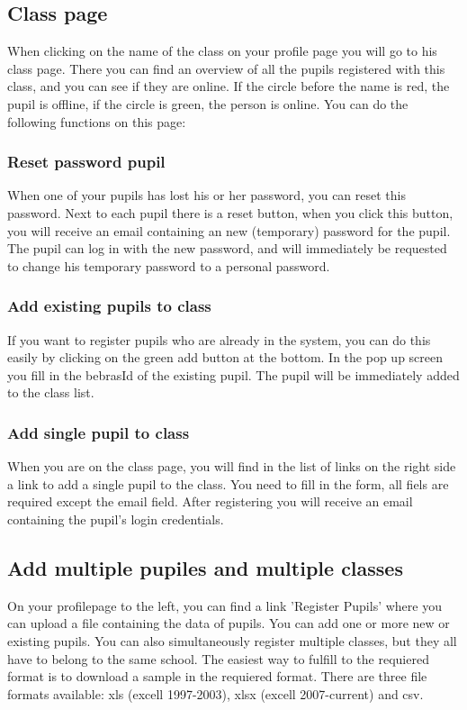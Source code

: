 \documentclass[11pt,a4paper]{report}
\begin{document}
\subsection{Class page}
When clicking on the name of the class on your profile page you will go to his class page. There you can find an overview of all the pupils registered with this class, and you can see if they are online. If the circle before the name is red, the pupil is offline, if the circle is green, the person is online. You can do the following functions on this page:

\subsubsection{Reset password pupil}
When one of your pupils has lost his or her password, you can reset this password. Next to each pupil there is a reset button, when you click this button, you will receive an email containing an new (temporary) password for the pupil. The pupil can log in with the new password, and will immediately be requested to change his temporary password to a personal password.

\subsubsection{Add existing pupils to class}
If you want to register pupils who are already in the system, you can do this easily by clicking on the green add button at the bottom. In the pop up screen you fill in the bebrasId of the existing pupil. The pupil will be immediately added to the class list.
\subsubsection{Add single pupil to class}
When you are on the class page, you will find in the list of links on the right side a link to add a single pupil to the class. You need to fill in the form, all fiels are required except the email field. After registering you will receive an email containing the pupil's login credentials.
\subsection{Add multiple pupiles and multiple classes}
On your profilepage to the left, you can find a link 'Register Pupils' where you can upload a file containing the data of pupils. You can add one or more new or existing pupils. You can also simultaneously register multiple classes, but they all have to belong to the same school. The easiest way to fulfill to the requiered format is to download a sample in the requiered format. There are three file formats available: xls (excell 1997-2003), xlsx (excell 2007-current) and csv.
\end{document}
